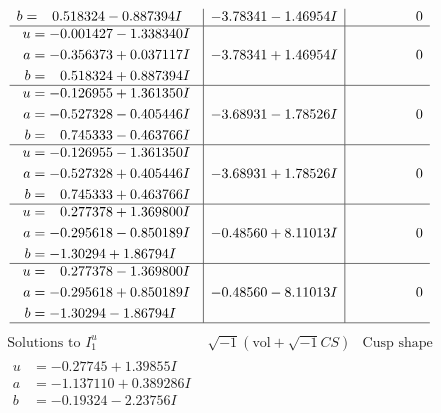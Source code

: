 \documentclass[1p]{elsarticle_modified}
\theoremstyle{definition}
\newcommand{\I}{\sqrt{-1}}
\begin{document}
$$\begin{array}{c|c|c}
\begin{aligned}
b &= \phantom{-}0.518324 - 0.887394 I\end{aligned}
 & -3.78341 - 1.46954 I & \phantom{-0.000000 } 0 \\ \hline\begin{aligned}
u &= -0.001427 - 1.338340 I \\
a &= -0.356373 + 0.037117 I \\
b &= \phantom{-}0.518324 + 0.887394 I\end{aligned}
 & -3.78341 + 1.46954 I & \phantom{-0.000000 } 0 \\ \hline\begin{aligned}
u &= -0.126955 + 1.361350 I \\
a &= -0.527328 - 0.405446 I \\
b &= \phantom{-}0.745333 - 0.463766 I\end{aligned}
 & -3.68931 - 1.78526 I & \phantom{-0.000000 } 0 \\ \hline\begin{aligned}
u &= -0.126955 - 1.361350 I \\
a &= -0.527328 + 0.405446 I \\
b &= \phantom{-}0.745333 + 0.463766 I\end{aligned}
 & -3.68931 + 1.78526 I & \phantom{-0.000000 } 0 \\ \hline\begin{aligned}
u &= \phantom{-}0.277378 + 1.369800 I \\
a &= -0.295618 - 0.850189 I \\
b &= -1.30294 + 1.86794 I\end{aligned}
 & -0.48560 + 8.11013 I & \phantom{-0.000000 } 0 \\ \hline\begin{aligned}
u &= \phantom{-}0.277378 - 1.369800 I \\
a &= -0.295618 + 0.850189 I \\
b &= -1.30294 - 1.86794 I\end{aligned}
 & -0.48560 - 8.11013 I & \phantom{-0.000000 } 0\\
 \hline 
 \end{array}$$\newpage$$\begin{array}{c|c|c}  
\text{Solutions to }I^u_{1}& \I (\text{vol} + \sqrt{-1}CS) & \text{Cusp shape}\\
 \hline 
\begin{aligned}
u &= -0.27745 + 1.39855 I \\
a &= -1.137110 + 0.389286 I \\
b &= -0.19324 - 2.23756 I\end{aligned}

\end{array}$$
\end{document}
